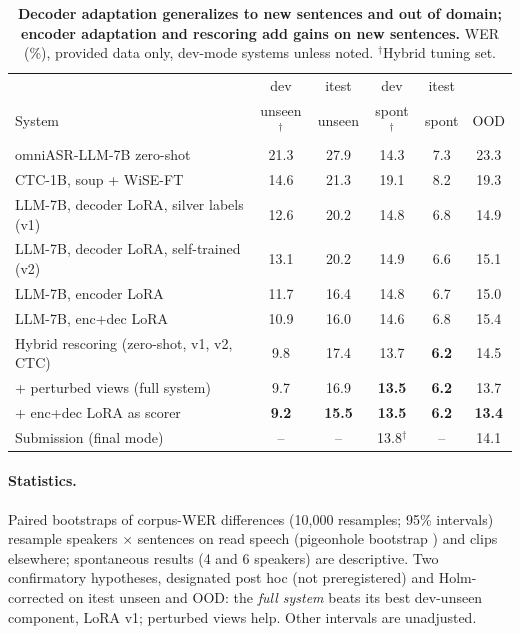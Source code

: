 \documentclass[runningheads]{llncs}
\begin{document}
\begin{table}[t]
\caption{\textbf{Decoder adaptation generalizes to new sentences and out of domain; encoder
adaptation and rescoring add gains on new sentences.} WER (\%), provided data only, dev-mode
systems unless noted. $^\dagger$Hybrid tuning set.}
\label{tab:main}
\centering\footnotesize
\setlength{\tabcolsep}{3.5pt}
\begin{tabular}{lccccc}
\toprule
& dev & itest & dev & itest & \\
System & unseen$^\dagger$ & unseen & spont$^\dagger$ & spont & OOD \\
\midrule
omniASR-LLM-7B zero-shot & 21.3 & 27.9 & 14.3 & 7.3 & 23.3 \\
CTC-1B, soup + WiSE-FT & 14.6 & 21.3 & 19.1 & 8.2 & 19.3 \\
LLM-7B, decoder LoRA, silver labels (v1) & 12.6 & 20.2 & 14.8 & 6.8 & 14.9 \\
LLM-7B, decoder LoRA, self-trained (v2) & 13.1 & 20.2 & 14.9 & 6.6 & 15.1 \\
LLM-7B, encoder LoRA & 11.7 & 16.4 & 14.8 & 6.7 & 15.0 \\
LLM-7B, enc+dec LoRA & 10.9 & 16.0 & 14.6 & 6.8 & 15.4 \\
\midrule
Hybrid rescoring (zero-shot, v1, v2, CTC) & 9.8 & 17.4 & 13.7 & \textbf{6.2} & 14.5 \\
\quad + perturbed views (full system) & 9.7 & 16.9 & \textbf{13.5} & \textbf{6.2} & 13.7 \\
\quad + enc+dec LoRA as scorer & \textbf{9.2} & \textbf{15.5} & \textbf{13.5} & \textbf{6.2} &
\textbf{13.4} \\
\midrule
Submission (final mode) & -- & -- & 13.8$^\dagger$ & -- & 14.1 \\
\bottomrule
\end{tabular}
\end{table}

\paragraph{Statistics.} Paired bootstraps of corpus-WER differences \cite{bisani2004bootstrap}
(10{,}000 resamples; 95\% intervals) resample speakers $\times$ sentences on read
speech (pigeonhole bootstrap \cite{owen2007pigeonhole}) and clips elsewhere; spontaneous results
(4 and 6 speakers) are descriptive. Two confirmatory hypotheses, designated post hoc
(not preregistered) and Holm-corrected \cite{holm1979} on itest unseen and OOD: the \emph{full
system} beats its best dev-unseen component, LoRA v1; perturbed views help. Other intervals are
unadjusted.
\end{document}
